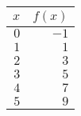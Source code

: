 \begin{tabular}{rr} \toprule
$x$  & $f(x)$ \\\midrule
$0$  & $-1$   \\[6pt]
$1$  & $1$    \\[6pt]
$2$  & $3$    \\[6pt]
$3$  & $5$    \\[6pt]
$4$  & $7$    \\[6pt]
$5$  & $9$    \\\bottomrule
\end{tabular}
